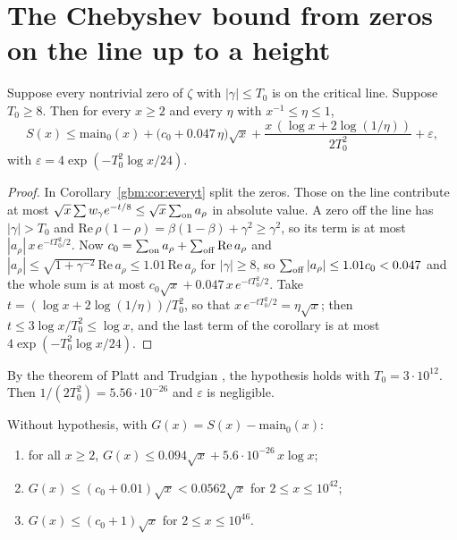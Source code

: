 \section{The Chebyshev bound from zeros on the line up to a height}\label{gbm:sec:cheb}

\begin{theorem}\label{gbm:thm:cheb}
Suppose every nontrivial zero of $\zeta$ with $|\gamma|\le T_0$ is on the critical line. Suppose $T_0\ge8$. Then for every $x\ge2$ and every $\eta$ with $x^{-1}\le\eta\le1$,
\[
S(x)\le\mathrm{main}_0(x)+\bigl(c_0+0.047\,\eta\bigr)\sqrt x+\frac{x\,(\log x+2\log(1/\eta))}{2T_0^2}+\varepsilon ,
\]
with $\varepsilon=4\exp(-T_0^2\log x/24)$.
\end{theorem}

\begin{proof}
In Corollary~\ref{gbm:cor:everyt} split the zeros. Those on the line contribute at most $\sqrt x\sum w_\gamma e^{-t/8}\le\sqrt x\sum_{\rm on}a_\rho$ in absolute value. A zero off the line has $|\gamma|>T_0$ and $\mathrm{Re}\,\rho(1-\rho)=\beta(1-\beta)+\gamma^2\ge\gamma^2$, so its term is at most $|a_\rho|\,x\,e^{-tT_0^2/2}$. Now $c_0=\sum_{\rm on}a_\rho+\sum_{\rm off}\mathrm{Re}\,a_\rho$ and $|a_\rho|\le\sqrt{1+\gamma^{-2}}\,\mathrm{Re}\,a_\rho\le1.01\,\mathrm{Re}\,a_\rho$ for $|\gamma|\ge8$, so $\sum_{\rm off}|a_\rho|\le1.01c_0<0.047$ and the whole sum is at most $c_0\sqrt x+0.047\,x\,e^{-tT_0^2/2}$. Take $t=(\log x+2\log(1/\eta))/T_0^2$, so that $x\,e^{-tT_0^2/2}=\eta\sqrt x$; then $t\le3\log x/T_0^2\le\log x$, and the last term of the corollary is at most $4\exp(-T_0^2\log x/24)$.
\end{proof}

By the theorem of Platt and Trudgian \cite{PT21}, the hypothesis holds with $T_0=3\cdot10^{12}$. Then $1/(2T_0^2)=5.56\cdot10^{-26}$ and $\varepsilon$ is negligible.

\begin{corollary}\label{gbm:cor:zeta}
Without hypothesis, with $G(x)=S(x)-\mathrm{main}_0(x)$:
\begin{enumerate}
\item for all $x\ge2$, $G(x)\le0.094\sqrt x+5.6\cdot10^{-26}\,x\log x$;
\item $G(x)\le(c_0+0.01)\sqrt x<0.0562\sqrt x$ for $2\le x\le10^{42}$;
\item $G(x)\le(c_0+1)\sqrt x$ for $2\le x\le10^{46}$.
\end{enumerate}
\end{corollary}

